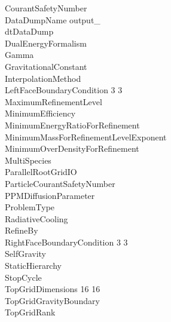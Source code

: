 \documentclass{book}
\begin{document}
{\begin{tabbing}
\> CourantSafetyNumber     \\
\> DataDumpName           \> output\_ \\
\> dtDataDump                       \\
\> DualEnergyFormalism            \\
\> Gamma                   \\
\> GravitationalConstant              \\
\> InterpolationMethod          \\
\> LeftFaceBoundaryCondition   3 3    \\
\> MaximumRefinementLevel         \\
\> MinimumEfficiency            \\
\> MinimumEnergyRatioForRefinement   \\
\> MinimumMassForRefinementLevelExponent  \\
\> MinimumOverDensityForRefinement   \\
\> MultiSpecies                 \\
\> ParallelRootGridIO      \\
\> ParticleCourantSafetyNumber  \\
\> PPMDiffusionParameter          \\
\> ProblemType                       \\
\> RadiativeCooling             \\
\> RefineBy                       \\
\> RightFaceBoundaryCondition  3 3 \\
\> SelfGravity                        \\
\> StaticHierarchy                \\
\> StopCycle                         \\
\> TopGridDimensions           16 16 \\
\> TopGridGravityBoundary             \\
\> TopGridRank                
\end{tabbing}}

\subsection{\cello}
\end{document}
